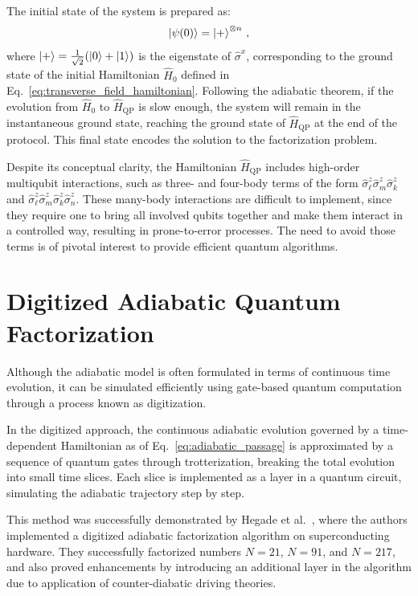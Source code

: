 The initial state of the system is prepared as:
\begin{equation}
	\ket{\psi(0)} = \ket{+}^{\otimes n}\,,
	\label{eq:initial_state}
\end{equation}
where $\ket{+} = \frac{1}{\sqrt{2}} (\ket{0} + \ket{1})$ is the eigenstate of $\hat{\sigma}^x$, corresponding to the ground state of the initial Hamiltonian $\hat{H}_0$ defined in Eq.~\ref{eq:transverse_field_hamiltonian}.
Following the adiabatic theorem, if the evolution from $\hat{H}_0$ to $\hat{H}_\mathrm{QP}$ is slow enough, the system will remain in the instantaneous ground state, reaching the ground state of $\hat{H}_\mathrm{QP}$ at the end of the protocol. This final state encodes the solution to the factorization problem.

Despite its conceptual clarity, the Hamiltonian $\hat{H}_\mathrm{QP}$ includes high-order multiqubit interactions, such as three- and four-body terms of the form $\hat{\sigma}_\ell^z \hat{\sigma}_m^z \hat{\sigma}_k^z$ and $\hat{\sigma}_\ell^z \hat{\sigma}_m^z \hat{\sigma}_k^z \hat{\sigma}_n^z$. These many-body interactions are difficult to implement, since they require one to bring all involved qubits together and make them interact in a controlled way, resulting in prone-to-error processes. The need to avoid those terms is of pivotal interest to provide efficient quantum algorithms.

\section{Digitized Adiabatic Quantum Factorization}
Although the adiabatic model is often formulated in terms of continuous time evolution, it can be simulated efficiently using gate-based quantum computation through a process known as digitization.

In the digitized approach, the continuous adiabatic evolution governed by a time-dependent Hamiltonian as of Eq.~\ref{eq:adiabatic_passage} is approximated by a sequence of quantum gates through trotterization, breaking the total evolution into small time slices. Each slice is implemented as a layer in a quantum circuit, simulating the adiabatic trajectory step by step.

This method was successfully demonstrated by Hegade et al.~\cite{hegade_digitized_2021}, where the authors implemented a digitized adiabatic factorization algorithm on superconducting hardware. They successfully factorized numbers $N=21$, $N=91$, and $N=217$, and also proved enhancements by introducing an additional layer in the algorithm due to application of counter-diabatic driving theories.

